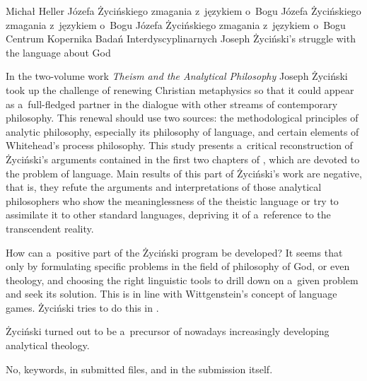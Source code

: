 \begin{artplenv}{Michał Heller}
	{Józefa Życińskiego zmagania z~językiem o~Bogu}
	{Józefa Życińskiego zmagania z~językiem o~Bogu}
	{Józefa Życińskiego zmagania z~językiem o~Bogu}
	{Centrum Kopernika Badań Interdyscyplinarnych}
	{Joseph Życiński's struggle with the language about God}
	{In the two-volume work \textit{Theism and the Analytical Philosophy} \parencites*{zycinski_teizm_1985}{zycinski_teizm_1988} Joseph Życiński took up the challenge of renewing Christian metaphysics so that it could appear as a~full-fledged partner in the dialogue with other streams of contemporary philosophy. This renewal should use two sources: the methodological principles of analytic philosophy, especially its philosophy of language, and certain elements of Whitehead's process philosophy. This study presents a~critical reconstruction of Życiński's arguments contained in the first two chapters of \parencite*[][]{zycinski_teizm_1985}, which are devoted to the problem of language. Main results of this part of Życiński's work are negative, that is, they refute the arguments and interpretations of those analytical philosophers who show the meaninglessness of the theistic language or try to assimilate it to other standard languages, depriving it of a~reference to the transcendent reality.
	
	How can a~positive part of the Życiński program be developed? It seems that only by formulating specific problems in the field of philosophy of God, or even theology, and choosing the right linguistic tools to drill down on a~given problem and seek its solution. This is in line with Wittgenstein's concept of language games. Życiński tries to do this in \parencite*[][]{zycinski_teizm_1988}.
	
	Życiński turned out to be a~precursor of nowadays increasingly developing analytical theology.}
	{No, keywords, in submitted files, and in the submission itself.}




\end{artplenv}

